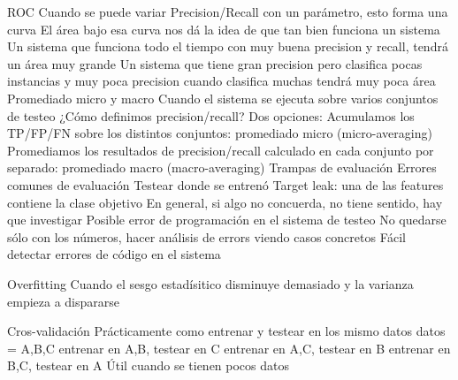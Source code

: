 ROC
Cuando se puede variar Precision/Recall con un parámetro, esto forma una curva
El área bajo esa curva nos dá la idea de que tan bien funciona un sistema
Un sistema que funciona todo el tiempo con muy buena precision y recall, tendrá un área muy grande
Un sistema que tiene gran precision pero clasifica pocas instancias y muy poca precision cuando clasifica muchas tendrá muy poca área
Promediado micro y macro
Cuando el sistema se ejecuta sobre varios conjuntos de testeo
¿Cómo definimos precision/recall?
Dos opciones:
Acumulamos los TP/FP/FN sobre los distintos conjuntos: promediado micro (micro-averaging)
Promediamos los resultados de precision/recall calculado en cada conjunto por separado: promediado macro (macro-averaging)
Trampas de evaluación
Errores comunes de evaluación
Testear donde se entrenó
Target leak: una de las features contiene la clase objetivo
En general, si algo no concuerda, no tiene sentido, hay que investigar
Posible error de programación en el sistema de testeo
No quedarse sólo con los números, hacer análisis de errors viendo casos concretos
Fácil detectar errores de código en el sistema

Overfitting
Cuando el sesgo estadísitico disminuye demasiado y la varianza empieza a dispararse

Cros-validación
Prácticamente como entrenar y testear en los mismo datos
datos = {A,B,C}
entrenar en A,B, testear en C
entrenar en A,C, testear en B
entrenar en B,C, testear en A
Útil cuando se tienen pocos datos


